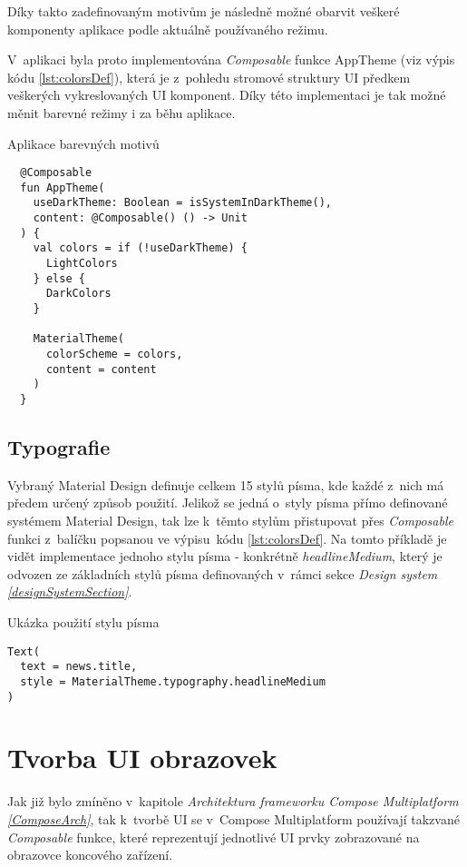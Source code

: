 Díky takto zadefinovaným motivům je následně možné obarvit veškeré komponenty aplikace podle aktuálně používaného režimu.

V~aplikaci byla proto implementována \textit{Composable} funkce AppTheme (viz výpis kódu \ref{lst:colorsDef}), která je z~pohledu stromové struktury
UI předkem veškerých vykreslovaných UI komponent. Díky této implementaci je tak možné měnit barevné režimy i za běhu aplikace. 
\begin{listing}[H]
\caption{Aplikace barevných motivů}\label{lst:colorsDef}
\begin{verbatim}
  @Composable
  fun AppTheme(
    useDarkTheme: Boolean = isSystemInDarkTheme(),
    content: @Composable() () -> Unit
  ) {
    val colors = if (!useDarkTheme) {
      LightColors
    } else {
      DarkColors
    }
  
    MaterialTheme(
      colorScheme = colors,
      content = content
    )
  }
\end{verbatim}
\end{listing}

\begin{sloppypar}
\subsection*{Typografie}
Vybraný Material Design definuje celkem 15 stylů písma, kde každé z~nich má předem určený způsob použití. \cite{material3} 
Jelikož se jedná o~styly písma přímo definované systémem Material Design, tak lze k~těmto stylům přistupovat přes
\textit{Composable} funkci  z~balíčku  popsanou ve výpisu~kódu \ref{lst:colorsDef}.
Na tomto příkladě je vidět implementace jednoho stylu písma - konkrétně \textit{headlineMedium}, který je odvozen ze základních stylů písma 
definovaných v~rámci sekce \textit{Design system \ref{designSystemSection}}.
\end{sloppypar}
\begin{listing}[H]
\caption{Ukázka použití stylu písma}\label{lst:typographyExample}
\begin{verbatim}
Text(
  text = news.title,
  style = MaterialTheme.typography.headlineMedium
)
\end{verbatim}
\end{listing}

\section{Tvorba UI obrazovek}
Jak již bylo zmíněno v~kapitole \textit{Architektura frameworku Compose Multiplatform \ref{ComposeArch}}, tak k~tvorbě UI se v~Compose Multiplatform 
používají takzvané \textit{Composable} funkce, které reprezentují jednotlivé UI prvky zobrazované na obrazovce koncového zařízení. 

